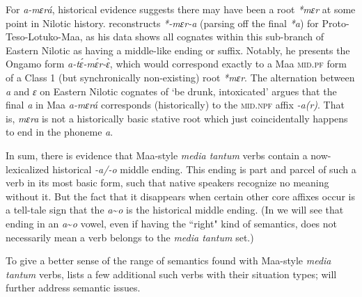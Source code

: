 \documentclass[output=paper,colorlinks,citecolor=brown
]{langscibook}
\begin{document}
For \textit{a-mɛrá}, historical evidence suggests there may have been a root \emph{*mɛr} at some point in Nilotic history. \citet[357]{Vossen1982} reconstructs \emph{*-mɛr-a} (parsing off the final \emph{*a}) for Proto-Teso-Lotuko-Maa, as his data shows all cognates within this sub-branch of Eastern Nilotic as having a middle-like ending or suffix. Notably, he presents the Ongamo form
\emph{a-tɛ́-mɛ́r-ɛ̀}, which would correspond exactly to a Maa \textsc{mid.pf} form of a Class 1 (but synchronically non-existing) root \emph{*mɛr}. The alternation between \textit{a} and \textit{ɛ} on Eastern Nilotic cognates of ‘be drunk, intoxicated’ argues that the final \textit{a} in Maa \textit{a-mɛrá} corresponds (historically) to the \textsc{mid.npf} affix \textit{-a(r)}. That is, \textit{mɛra} is not a historically basic stative root which just coincidentally happens to end in the phoneme \textit{a}.

In sum, there is evidence that Maa-style \textit{media tantum} verbs contain a now-lexicalized historical \textit{-a/-o} middle ending. This ending is part and parcel of such a verb in its most basic form, such that native speakers recognize no meaning without it. But the fact that it disappears when certain other core affixes occur is a tell-tale sign that the \textit{a}\sim\textit{o} is the historical middle ending. (In  we will see that ending in an  \textit{a}\sim\textit{o} vowel, even if having the ``right" kind of semantics, does not necessarily mean a verb belongs to the \textit{media tantum} set.)

To give a better sense of the range of semantics found with Maa-style \textit{media tantum} verbs,  lists a few additional such verbs with their situation types;  will further address semantic issues.
\end{document}
